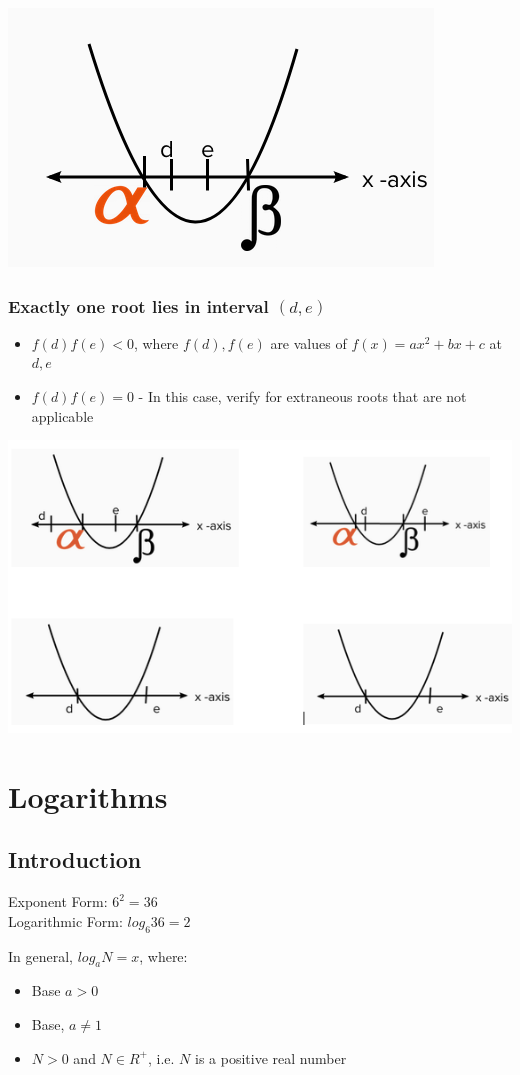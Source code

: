 \documentclass{book}
\begin{document}
	\includegraphics[scale=0.6]{condition4}
	
	\subsection{Exactly one root lies in interval $(d,e)$}
	\begin{itemize}
		\item $f(d)f(e) <0$, where $f(d),f(e)$ are values of $f(x) = ax^2+bx+c$ at $d,e$
		\item $f(d)f(e)=0$ - In this case, verify for extraneous roots that are not applicable
	\end{itemize}
	
	\includegraphics[scale=0.6]{condition5}
	
	\chapter{Logarithms}
	\section{Introduction}
	Exponent Form: $6^2 = 36$ \\
	Logarithmic Form: $log_6{36} = 2$
	\begin{mdframed}[backgroundcolor=yellow]
		In general, $log_aN = x$, where:
		\begin{itemize}
			\item Base $a>0$
			\item Base, $a \neq 1$
			\item $N > 0$ and $N \in R^+$, i.e. $N$ is a positive real number
		\end{itemize}
	\end{mdframed}
\end{document}
